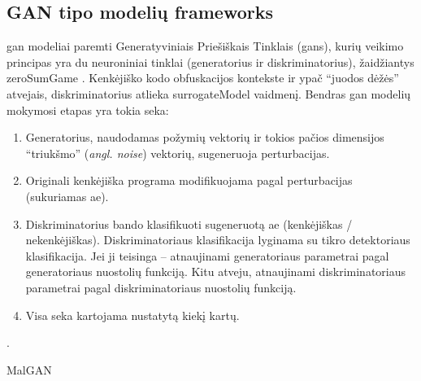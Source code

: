 \subsection{GAN tipo modelių \glspl{framework}}\label{sec:literature:gan}

\acs{gan} modeliai paremti Generatyviniais Priešiškais Tinklais (\aclp{gan}), kurių veikimo principas yra du neuroniniai tinklai (generatorius ir diskriminatorius), žaidžiantys \gls{zeroSumGame} \citeplace. Kenkėjiško kodo obfuskacijos kontekste ir ypač \enquote{juodos dėžės} atvejais, diskriminatorius atlieka \gls{surrogateModel} vaidmenį. Bendras \ac{gan} modelių mokymosi etapas yra tokia seka:
\begin{enumerate}
    \item Generatorius, naudodamas požymių vektorių ir tokios pačios dimensijos
          \enquote{triukšmo} (\textit{angl. noise}) vektorių, sugeneruoja perturbacijas.
    \item Originali kenkėjiška programa modifikuojama pagal perturbacijas (sukuriamas
          \ac{ae}).
    \item Diskriminatorius bando klasifikuoti sugeneruotą \ac{ae} (kenkėjiškas /
          nekenkėjiškas). Diskriminatoriaus klasifikacija lyginama su tikro detektoriaus
          klasifikacija. Jei ji teisinga -- atnaujinami generatoriaus parametrai pagal
          generatoriaus nuostolių funkciją. Kitu atveju, atnaujinami diskriminatoriaus
          parametrai pagal diskriminatoriaus nuostolių funkciją.
    \item Visa seka kartojama nustatytą kiekį kartų.
\end{enumerate} \citeplace.

\begin{describeFramework}{MalGAN}{\cite{huGeneratingAdversarialMalware2017}}
\end{describeFramework}

